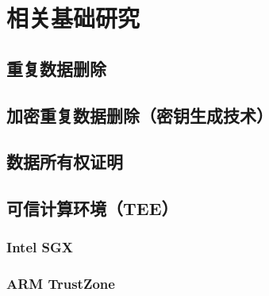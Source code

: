 \chapter{相关基础研究}
\label{chapter:background}

\section{重复数据删除}
\label{sec:background-deduplication}
\section{加密重复数据删除（密钥生成技术）}
\label{sec:background-encrypted-deduplication}
\section{数据所有权证明}
\label{sec:background-pow}
\section{可信计算环境（TEE）}
\label{sec:background-tee}
\subsection{Intel SGX}
\label{subsec:background-tee-sgx}
\subsection{ARM TrustZone}
\label{subsec:background-tee-tz}
